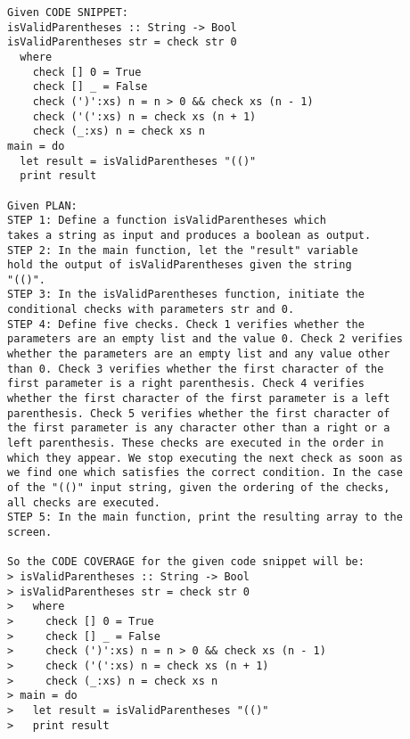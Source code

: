 \documentclass[sigconf]{acmart}
\begin{document}
\begin{verbatim}
Given CODE SNIPPET:
isValidParentheses :: String -> Bool
isValidParentheses str = check str 0
  where
    check [] 0 = True
    check [] _ = False
    check (')':xs) n = n > 0 && check xs (n - 1)
    check ('(':xs) n = check xs (n + 1)
    check (_:xs) n = check xs n
main = do
  let result = isValidParentheses "(()"
  print result

Given PLAN: 
STEP 1: Define a function isValidParentheses which
takes a string as input and produces a boolean as output.
STEP 2: In the main function, let the "result" variable
hold the output of isValidParentheses given the string
"(()".
STEP 3: In the isValidParentheses function, initiate the
conditional checks with parameters str and 0.
STEP 4: Define five checks. Check 1 verifies whether the
parameters are an empty list and the value 0. Check 2 verifies
whether the parameters are an empty list and any value other
than 0. Check 3 verifies whether the first character of the
first parameter is a right parenthesis. Check 4 verifies
whether the first character of the first parameter is a left
parenthesis. Check 5 verifies whether the first character of
the first parameter is any character other than a right or a
left parenthesis. These checks are executed in the order in
which they appear. We stop executing the next check as soon as
we find one which satisfies the correct condition. In the case
of the "(()" input string, given the ordering of the checks,
all checks are executed.
STEP 5: In the main function, print the resulting array to the
screen.

So the CODE COVERAGE for the given code snippet will be: 
> isValidParentheses :: String -> Bool
> isValidParentheses str = check str 0
>   where
>     check [] 0 = True
>     check [] _ = False
>     check (')':xs) n = n > 0 && check xs (n - 1)
>     check ('(':xs) n = check xs (n + 1)
>     check (_:xs) n = check xs n
> main = do
>   let result = isValidParentheses "(()"
>   print result
\end{verbatim}
\end{document}

